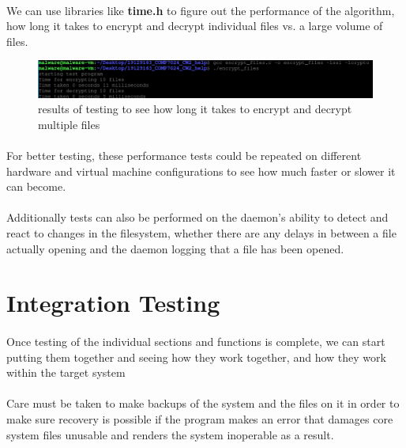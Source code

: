 \documentclass{article}
\begin{document}
    \paragraph{}We can use libraries like \textbf{time.h} to figure out the performance of the algorithm, how long it takes to encrypt and decrypt individual files vs. a large volume of files.
    \begin{figure}[htbp]
        \centering\includegraphics[width=\textwidth]{encrypt_test.png}
        \caption{results of testing to see how long it takes to encrypt and decrypt multiple files}
        \label{fig:my_label}
    \end{figure}
    \paragraph{}For better testing, these performance tests could be repeated on different hardware and virtual machine configurations to see how much faster or slower it can become.
    \paragraph{}Additionally tests can also be performed on the daemon's ability to detect and react to changes in the filesystem, whether there are any delays in between a file actually opening and the daemon logging that a file has been opened.

\section{Integration Testing}
    \paragraph{}Once testing of the individual sections and functions is complete, we can start putting them together and seeing how they work together, and how they work within the target system
    \paragraph{}Care must be taken to make backups of the system and the files on it in order to make sure recovery is possible if the program makes an error that damages core system files unusable and renders the system inoperable as a result.
\end{document}
